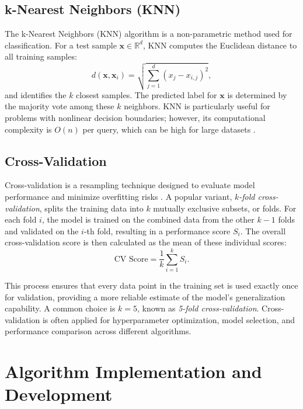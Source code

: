 \documentclass[11pt]{amsart}
\begin{document}
\subsection{k-Nearest Neighbors (KNN)}
The k-Nearest Neighbors (KNN) algorithm is a non-parametric method used for classification. For a test sample \(\mathbf{x} \in \mathbb{R}^d\), KNN computes the Euclidean distance to all training samples:
\[
d(\mathbf{x}, \mathbf{x}_i) = \sqrt{\sum_{j=1}^{d} \left(x_j - x_{i,j}\right)^2},
\]
and identifies the \(k\) closest samples. The predicted label for \(\mathbf{x}\) is determined by the majority vote among these \(k\) neighbors. KNN is particularly useful for problems with nonlinear decision boundaries; however, its computational complexity is \(O(n)\) per query, which can be high for large datasets \cite{Cover1967}.

\subsection{Cross-Validation}

Cross-validation is a resampling technique designed to evaluate model performance and minimize overfitting risks \cite{Hastie2009}. A popular variant, \emph{$k$-fold cross-validation}, splits the training data into $k$ mutually exclusive subsets, or folds. For each fold $i$, the model is trained on the combined data from the other $k-1$ folds and validated on the $i$-th fold, resulting in a performance score $S_i$. The overall cross-validation score is then calculated as the mean of these individual scores:
\[
\text{CV Score} = \frac{1}{k} \sum_{i=1}^{k} S_i.
\]

This process ensures that every data point in the training set is used exactly once for validation, providing a more reliable estimate of the model's generalization capability. A common choice is $k=5$, known as \emph{5-fold cross-validation}. Cross-validation is often applied for hyperparameter optimization, model selection, and performance comparison across different algorithms.


\section{Algorithm Implementation and Development}
\end{document}
